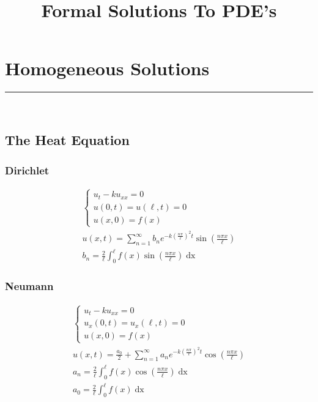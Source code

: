 \documentclass{article}
\title{Formal Solutions To PDE's}
\date{}
\begin{document}
\maketitle
\section{Homogeneous Solutions}
\hrule
\noindent\\
\subsection{The Heat Equation}
\subsubsection*{Dirichlet}
\begin{gather*}
\begin{cases}
u_{t} - ku_{xx} = 0\\
u(0,t) = u(\ell,t) = 0\\
u(x,0) = f(x)
\end{cases}\\
u(x,t) = \sum_{n=1}^{\infty}b_{n}e^{-k\left(\frac{n\pi}{\ell}\right)^{2}t}\sin{\left(\frac{n\pi x}{\ell}\right)}\\
b_{n} = \frac{2}{\ell}\int_{0}^{\ell}f(x)\sin{\left(\frac{n\pi x}{\ell}\right)}\mathop{dx}
\end{gather*}

\subsubsection*{Neumann}
\begin{gather*}
\begin{cases}
u_{t} - ku_{xx} = 0\\
u_{x}(0,t) = u_{x}(\ell,t) = 0\\
u(x,0) = f(x)
\end{cases}\\
u(x,t) = \frac{a_{0}}{2} + \sum_{n=1}^{\infty}a_{n}e^{-k\left(\frac{n\pi}{\ell}\right)^{2}t}\cos{\left(\frac{n\pi x}{\ell}\right)}\\
a_{n} = \frac{2}{\ell}\int_{0}^{\ell}f(x)\cos{\left(\frac{n\pi x}{\ell}\right)}\mathop{dx}\\
a_{0} = \frac{2}{\ell}\int_{0}^{\ell}f(x)\mathop{dx}\\
\end{gather*}
\end{document}
